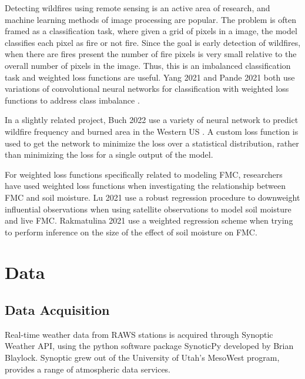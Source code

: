 \documentclass[11pt]{article}%
\begin{document}
Detecting wildfires using remote sensing is an active area of research, and machine learning methods of image processing are popular. The problem is often framed as a classification task, where given a grid of pixels in a image, the model classifies each pixel as fire or not fire. Since the goal is early detection of wildfires, when there are fires present the number of fire pixels is very small relative to the overall number of pixels in the image. Thus, this is an imbalanced classification task and weighted loss functions are useful. Yang 2021 and Pande 2021 both use variations of convolutional neural networks for classification with weighted loss functions to address class imbalance \cite{Yang-2021-PFF}\cite{Pande-2021-WSF}.

In a slightly related project, Buch 2022 use a variety of neural network to predict wildfire frequency and burned area in the Western US \cite{Buch-2022-SML}. A custom loss function is used to get the network to minimize the loss over a statistical distribution, rather than minimizing the loss for a single output of the model.

For weighted loss functions specifically related to modeling FMC, researchers have used weighted loss functions when investigating the relationship between FMC and soil moisture. Lu 2021 use a robust regression procedure to downweight influential observations when using satellite observations to model soil moisture and live FMC. \cite{Lu-2021-EMS} Rakmatulina 2021 use a weighted regression scheme when trying to perform inference on the size of the effect of soil moisture on FMC. \cite{Rakhmatulina-2021-SMI}


\section{Data}
\subsection{Data Acquisition}

Real-time weather data from RAWS stations is acquired through Synoptic Weather API, using the python software package SynoticPy developed by Brian Blaylock. \cite{Synoptic}\cite{Blaylock-2023-SP} Synoptic grew out of the University of Utah's MesoWest program, provides a range of atmospheric data services.
\end{document}
